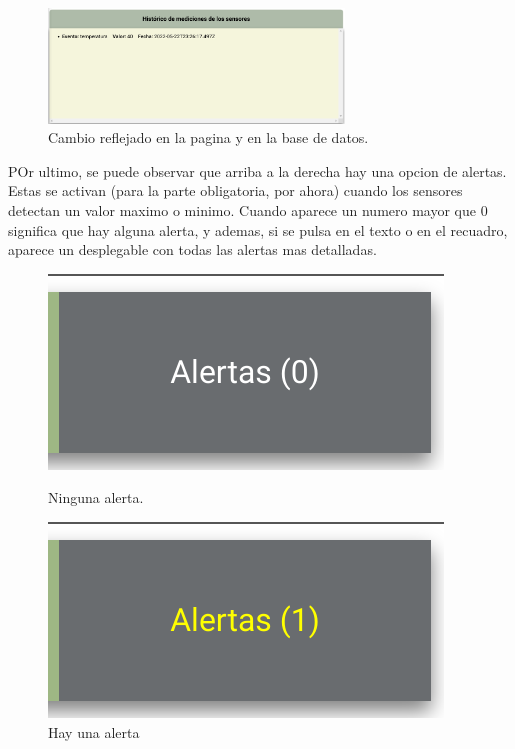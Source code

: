 \documentclass{article}
\begin{document}
\begin{figure}[H]
    \centering
    \includegraphics[width=0.7\textwidth]{images/cambiovalordb.png}
    \caption{Cambio reflejado en la pagina y en la base de datos.}
\end{figure}


POr ultimo, se puede observar que arriba a la derecha hay una opcion de alertas. Estas se activan (para la parte obligatoria, por ahora) cuando los sensores detectan un valor maximo o minimo. Cuando aparece un numero mayor que 0 significa que hay alguna alerta, y ademas, si se pulsa en el texto o en el recuadro, aparece un desplegable con todas las alertas mas detalladas.

\begin{figure}[H]
    \centering
    \begin{minipage}[H]{0.49\textwidth}
        \centering
        \includegraphics[width=\textwidth]{images/alerta0.png}
        \caption{Ninguna alerta.}
    \end{minipage}
    \hfill
    \begin{minipage}[H]{0.49\textwidth}
        \centering
        \includegraphics[width=\textwidth]{images/alerta1.png}
        \caption{Hay una alerta}
    \end{minipage}
\end{figure}
\end{document}
